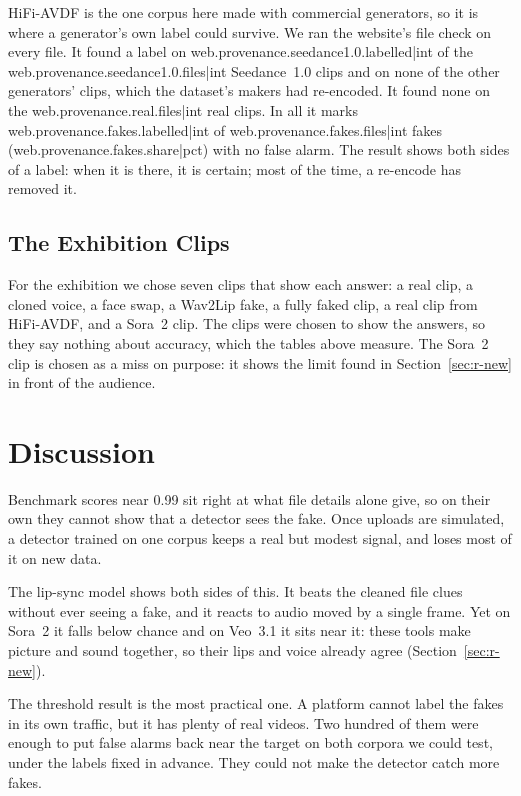 HiFi-AVDF is the one corpus here made with commercial generators, so it is
where a generator's own label could survive. We ran the website's file check
on every file. It found a label on {{web.provenance.seedance1.0.labelled|int}}
of the {{web.provenance.seedance1.0.files|int}} Seedance~1.0 clips and on none
of the other generators' clips, which the dataset's makers had re-encoded. It
found none on the {{web.provenance.real.files|int}} real clips. In all it
marks {{web.provenance.fakes.labelled|int}} of
{{web.provenance.fakes.files|int}} fakes ({{web.provenance.fakes.share|pct}})
with no false alarm. The result shows both sides of a label: when it is
there, it is certain; most of the time, a re-encode has removed it.

\subsection{The Exhibition Clips}

For the exhibition we chose seven clips that show each answer: a real clip,
a cloned voice, a face swap, a Wav2Lip fake, a fully faked clip, a real clip
from HiFi-AVDF, and a Sora~2 clip. The clips were chosen to show the
answers, so they say nothing about accuracy, which the tables above measure.
The Sora~2 clip is chosen as a miss on purpose: it shows the limit found in
Section~\ref{sec:r-new} in front of the audience.

\section{Discussion}
\label{sec:r-discussion}

Benchmark scores near 0.99 sit right at what file details alone give, so on
their own they cannot show that a detector sees the fake. Once uploads are
simulated, a detector trained on one corpus keeps a real but modest signal,
and loses most of it on new data.

The lip-sync model shows both sides of this. It beats the cleaned file clues
without ever seeing a fake, and it reacts to audio moved by a single frame.
Yet on Sora~2 it falls below chance and on Veo~3.1 it sits near it: these
tools make picture and sound together, so their lips and voice already agree
(Section~\ref{sec:r-new}).

The threshold result is the most practical one. A platform cannot label the
fakes in its own traffic, but it has plenty of real videos. Two hundred of
them were enough to put false alarms back near the target on both corpora we
could test, under the labels fixed in advance. They could not make the
detector catch more fakes.

